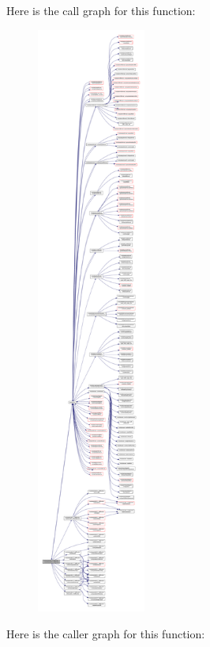 Here is the call graph for this function\+:\nopagebreak
\begin{figure}[H]
\begin{center}
\leavevmode
\includegraphics[height=550pt]{namespacemodulenetcdfcf__2__hdf5mohid_ad44cbe3d10b2660f418505ecaee704cc_cgraph}
\end{center}
\end{figure}
Here is the caller graph for this function\+:\nopagebreak

